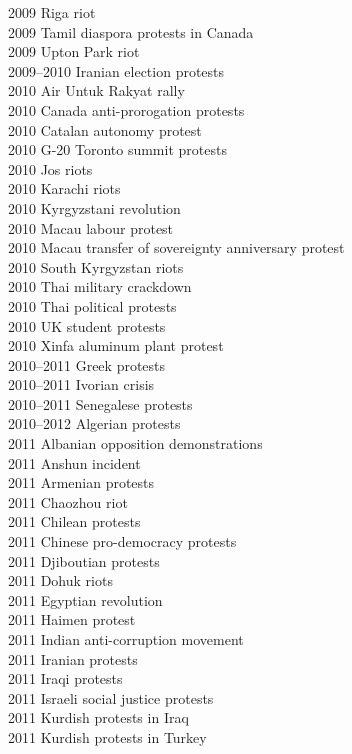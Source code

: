 2009 Riga riot\\
2009 Tamil diaspora protests in Canada\\
2009 Upton Park riot\\
2009–2010 Iranian election protests\\
2010 Air Untuk Rakyat rally\\
2010 Canada anti-prorogation protests\\
2010 Catalan autonomy protest\\
2010 G-20 Toronto summit protests\\
2010 Jos riots\\
2010 Karachi riots\\
2010 Kyrgyzstani revolution\\
2010 Macau labour protest\\
2010 Macau transfer of sovereignty anniversary protest\\
2010 South Kyrgyzstan riots\\
2010 Thai military crackdown\\
2010 Thai political protests\\
2010 UK student protests\\
2010 Xinfa aluminum plant protest\\
2010–2011 Greek protests\\
2010–2011 Ivorian crisis\\
2010–2011 Senegalese protests\\
2010–2012 Algerian protests\\
2011 Albanian opposition demonstrations\\
2011 Anshun incident\\
2011 Armenian protests\\
2011 Chaozhou riot\\
2011 Chilean protests\\
2011 Chinese pro-democracy protests\\
2011 Djiboutian protests\\
2011 Dohuk riots\\
2011 Egyptian revolution\\
2011 Haimen protest\\
2011 Indian anti-corruption movement\\
2011 Iranian protests\\
2011 Iraqi protests\\
2011 Israeli social justice protests\\
2011 Kurdish protests in Iraq\\
2011 Kurdish protests in Turkey\\

